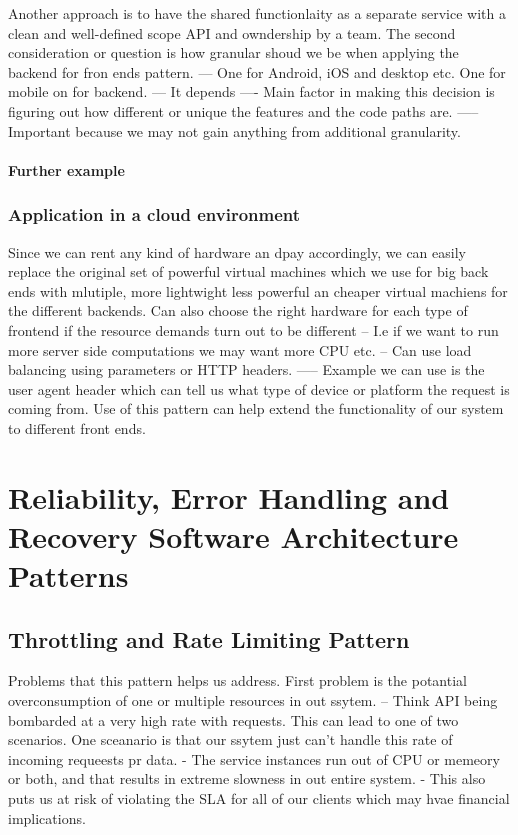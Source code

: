 \documentclass[a4paper, 11pt]{book}
\begin{document}
    Another approach is to have the shared functionlaity as a separate service with a clean and well-defined scope API and owndership by a team.
    The second consideration or question is how granular shoud we be when applying the backend for fron ends pattern.
    --- One for Android, iOS and desktop etc. One for mobile on for backend.
    --- It depends
    ---- Main factor in making this decision is figuring out how different or unique the features and the code paths are.
    ----- Important because we may not gain anything from additional granularity.

    \paragraph{Further example}

    \subsubsection{Application in a cloud environment}
    Since we can rent any kind of hardware an dpay accordingly, we can easily replace the original set of powerful virtual machines which we use for big back ends with mlutiple, more lightwight less powerful an cheaper virtual machiens for the different backends.
    Can also choose the right hardware for each type of frontend if the resource demands turn out to be different
    -- I.e if we want to run more server side computations we may want more CPU etc.
    -- Can use load balancing using parameters or HTTP headers.
    ----- Example we can use is the user agent header which can tell us what type of device or platform the request is coming from.
    Use of this pattern can help extend the functionality of our system to different front ends.


    \section{Reliability, Error Handling and Recovery Software Architecture Patterns}

    \subsection{Throttling and Rate Limiting Pattern}
    Problems that this pattern helps us address.
    First problem is the potantial overconsumption of one or multiple resources in out ssytem.
    -- Think API being bombarded at a very high rate with requests.
    This can lead to one of two scenarios.
    One sceanario is that our ssytem just can't handle this rate of incoming requeests pr data.
    - The service instances run out of CPU or memeory or both, and that results in extreme slowness in out entire system.
    - This also puts us at risk of violating the SLA for all of our clients which may hvae financial implications.
\end{document}
